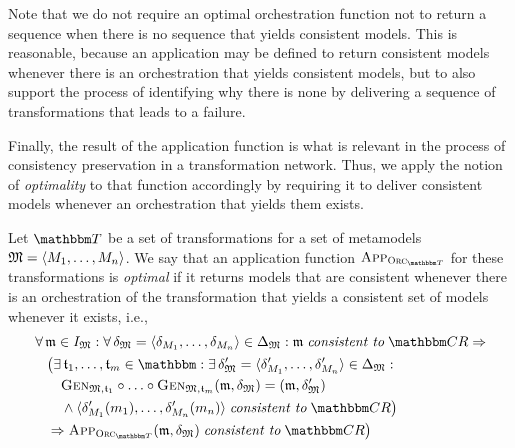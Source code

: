 Note that we do not require an optimal orchestration function not to return a sequence when there is no sequence that yields consistent models.
This is reasonable, because an application may be defined to return consistent models whenever there is an orchestration that yields consistent models, but to also support the process of identifying why there is none by delivering a sequence of transformations that leads to a failure.

Finally, the result of the application function is what is relevant in the process of consistency preservation in a transformation network.
Thus, we apply the notion of \emph{optimality} to that function accordingly by requiring it to deliver consistent models whenever an orchestration that yields them exists.

\begin{definition}
    \label{def:optimalapplicationfunction}
    Let $\transformationset{T}$ be a set of transformations for a set of metamodels $\mathfrak{M} = \langle M_{1}, \dots, M_{n} \rangle$.
    We say that an application function $\appfunction{\orcfunction{\transformationset{T}}}$ for these transformations is \emph{optimal} if it returns models that are consistent whenever there is an orchestration of the transformation that yields a consistent set of models whenever it exists, i.e.,
    \begin{align*}
        &
        \forall \modeltuple{m} \in \metamodeltupleinstanceset{M} : \forall \changetuple{\metamodeltuple{M}} = \tupled{\change{\metamodel{M}{1}}, \dots, \change{\metamodel{M}{n}}} \in \changeuniverse{\metamodeltuple{M}} :
        \modeltuple{m} \consistenttomath \consistencyrelationset{CR} \Rightarrow \\
        & \formulaskip
        \bigl(
            \exists \transformation{t}_{1}, \dots, \transformation{t}_{m} \in \transformationset{} : 
            \exists \changetuple{\metamodeltuple{M}}' = \tupled{\change{\metamodel{M}{1}}', \dots, \change{\metamodel{M}{n}}'} \in \changeuniverse{\metamodeltuple{M}} :\\
            & \formulaskip \formulaskip
            \generalizationfunction{\metamodeltuple{M}, \transformation{t}_{1}} \concatfunction \dots \concatfunction \generalizationfunction{\metamodeltuple{M}, \transformation{t}_{m}}(\modeltuple{m}, \changetuple{\metamodeltuple{M}}) = (\modeltuple{m}, \changetuple{\metamodeltuple{M}}')\\
            & \formulaskip \formulaskip
            \land \tupled{\change{\metamodel{M}{1}}'(\model{m}{1}), \dots, \change{\metamodel{M}{n}}'(\model{m}{n})} \consistenttomath \consistencyrelationset{CR} \bigr) \\
            & \formulaskip
            \Rightarrow \appfunction{\orcfunction{\transformationset{T}}}(\modeltuple{m},\changetuple{\metamodeltuple{M}}) \consistenttomath \consistencyrelationset{CR}
        \bigr)
    \end{align*}
\end{definition}

